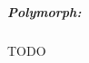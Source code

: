 \documentclass[../VancianToPsionics.tex]{subfiles}
\begin{document}
\subparagraph{Polymorph:} TODO

\end{document}
